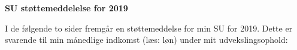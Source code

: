 \documentclass[../Ansoegning.tex]{subfiles}
\begin{document}
\begin{center}
    \Large{\textbf{SU støttemeddelelse for 2019}}\vspace{-0.7cm}
\end{center}

I de følgende to sider fremgår en støttemeddelse for min SU for 2019. Dette er svarende til min månedlige indkomst (læs: løn) under mit udvekslingsophold:

\begin{minipage}{1\textwidth}

\end{minipage}
    \newpage

\begin{minipage}{1.0\textwidth}

\end{minipage}
    \newpage
\end{document}
